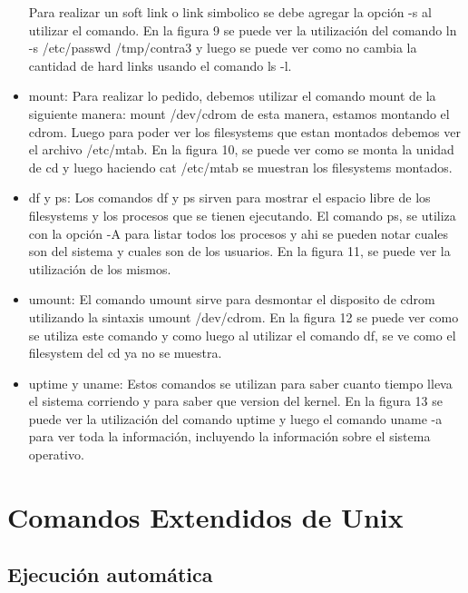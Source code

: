 \documentclass[a4paper, 12pt]{article}
\begin{document}
\begin{itemize}
Para realizar un soft link o link simbolico se debe agregar la opci\'on -s al utilizar el comando. En la figura 9 se puede ver la utilizaci\'on del comando ln -s /etc/passwd /tmp/contra3 y luego se puede ver como no cambia la cantidad de hard links usando el comando ls -l.

\item mount: Para realizar lo pedido, debemos utilizar el comando mount de la siguiente manera: mount /dev/cdrom de esta manera, estamos montando el cdrom. Luego para poder ver los filesystems que estan montados debemos ver el archivo /etc/mtab. En la figura 10, se puede ver como se monta la unidad de cd y luego haciendo cat /etc/mtab se muestran los filesystems montados.

\item df y ps: Los comandos df y ps sirven para mostrar el espacio libre de los filesystems y los procesos que se tienen ejecutando. El comando ps, se utiliza con la opci\'on -A para listar todos los procesos y ahi se pueden notar cuales son del sistema y cuales son de los usuarios. En la figura 11, se puede ver la utilizaci\'on de los mismos.

\item umount: El comando umount sirve para desmontar el disposito de cdrom utilizando la sintaxis umount /dev/cdrom. En la figura 12 se puede ver como se utiliza este comando y como luego al utilizar el comando df, se ve como el filesystem del cd ya no se muestra.

\item uptime y uname: Estos comandos se utilizan para saber cuanto tiempo lleva el sistema corriendo y para saber que version del kernel. En la figura 13 se puede ver la utilizaci\'on del comando uptime y luego el comando uname -a para ver toda la informaci\'on, incluyendo la informaci\'on sobre el sistema operativo.

\end{itemize}

\section*{Comandos Extendidos de Unix}

\subsection*{Ejecuci\'on autom\'atica}
\end{document}
